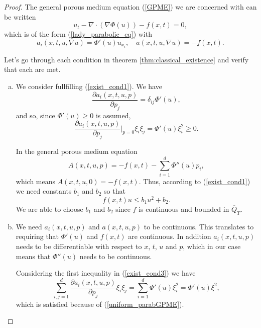\documentclass[11pt, a4paper]{article}
\begin{document}
\begin{proof}

The general porous medium equation (\ref{GPME}) we are concerned with can be written
\begin{equation*}
u_t - \nabla \cdot (\nabla \Phi(u) ) - f(x,t) = 0,
\end{equation*}
which is of the form (\ref{lady_parabolic_eq}) with
\begin{equation}
a_i(x,t,u,\nabla u) = \Phi'(u) u_{x_i}, \quad a(x,t,u,\nabla u) = -f(x,t).
\end{equation}


Let's go through each condition in theorem \ref{thm:classical_existence} and verify that each are met.

\begin{enumerate}[a)]
	\item We consider fullfilling (\ref{exist_cond1}). We have
	\begin{equation*}
		\frac{\partial a_i(x,t,u,p)}{\partial p_j} = \delta_{ij} \Phi'(u),
	\end{equation*}
	and so, since $\Phi'(u) \geq 0$ is assumed,
	\begin{equation*}
		\frac{\partial a_i(x,t,u,p)}{\partial p_j}\Bigg|_{p=0}\xi_i\xi_j = \Phi'(u)\xi_i^2 \geq 0.
	\end{equation*}
	
	In the general porous medium equation
	\begin{equation*}
		A(x,t,u,p) = -f(x,t) - \sum_{i=1}^d \Phi''(u)p_i,
	\end{equation*}
	which means $A(x,t,u,0) = -f(x,t)$. Thus, according to (\ref{exist_cond1}) we need constants $b_1$ and $b_2$ so that
	\begin{equation*}
		f(x,t)u \leq b_1 u^2 + b_2.
	\end{equation*}
	We are able to choose $b_1$ and $b_2$ since $f$ is continuous and bounded in $\overline{Q}_T$.
	
	\item We need $a_i(x,t,u,p)$ and $a(x,t,u,p)$ to be continuous. This translates to requiring that $\Phi'(u)$ and $f(x,t)$ are continuous. In addition $a_i(x,t,u,p)$ needs to be differentiable with respect to $x$, $t$, $u$ and $p$, which in our case means that $\Phi''(u)$ needs to be continuous.
	
	Considering the first inequality in (\ref{exist_cond3}) we have
	\begin{equation*}
		\sum_{i,j=1}^d \frac{\partial a_i(x,t,u,p)}{\partial p_j} \xi_i \xi_j = \sum_{i=1}^d \Phi'(u)\xi_i^2 =\Phi'(u)\xi^2,
	\end{equation*}
	which is satisfied because of (\ref{uniform_parabGPME}).
	

\end{enumerate}
\end{proof}
\end{document}
